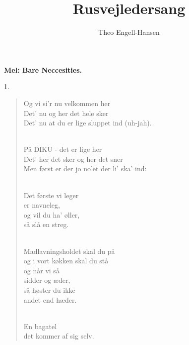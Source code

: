 \documentclass[a4paper,11pt]{article}
\title{Rusvejledersang}
\author{Theo Engell-Hansen}
\begin{document}
\maketitle


\begin{center}
{\bf Mel: Bare Neccesities.}
\end{center}


1.
\begin{verse}
Og vi si'r nu velkommen her\\
   Det' nu og her det hele sker\\
   Det' nu at du er lige sluppet ind (uh-jah).\\
\strut\\
   På DIKU - det er lige her\\
   Det' her det sker og her det sner\\
   Men først er der jo no'et der li' ska' ind:\\
\strut\\
   Det første vi leger\\
   er navneleg,\\
   og vil du ha' øller,\\
   så slå en streg.\\
\strut\\
   Madlavningsholdet skal du på\\
   og i vort køkken skal du stå\\
   og når vi så\\
   sidder og æder,\\
   så høster du ikke\\
   andet end hæder.\\
\strut\\
   En bagatel\\
   det kommer af sig selv.\\
\end{verse}
\end{document}
